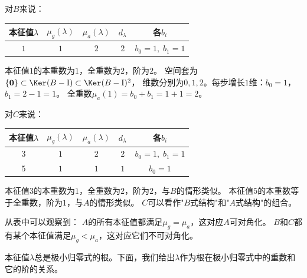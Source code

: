 \documentclass[12pt,UTF8,fontset=none]{ctexbook}
\begin{document}
对$B$来说：
\begin{center}
\begin{tabular}{c|c|c|c|c}
本征值$\lambda$ & $\mu_g(\lambda)$ & $\mu_a(\lambda)$ & $d_\lambda$ & 各$b_i$ \\
\hline
$1$ & $1$ & $2$ & $2$ & $b_0 = 1,\; b_1 = 1$ \\
\end{tabular}
\end{center}
本征值$1$的本重数为$1$，全重数为$2$，阶为$2$。
空间套为$\{\mathbf{0}\} \subset \Ker(B-\mathrm{I}) \subset \Ker(B-\mathrm{I})^2$，
维数分别为$0, 1, 2$。每步增长$1$维：$b_0 = 1$，$b_1 = 2 - 1 = 1$。
全重数$\mu_a(1) = b_0 + b_1 = 1 + 1 = 2$。

对$C$来说：
\begin{center}
\begin{tabular}{c|c|c|c|c}
本征值$\lambda$ & $\mu_g(\lambda)$ & $\mu_a(\lambda)$ & $d_\lambda$ & 各$b_i$ \\
\hline
$3$ & $1$ & $2$ & $2$ & $b_0 = 1,\; b_1 = 1$ \\
$5$ & $1$ & $1$ & $1$ & $b_0 = 1$ \\
\end{tabular}
\end{center}
本征值$3$的本重数为$1$，全重数为$2$，阶为$2$，与$B$的情形类似。
本征值$5$的本重数等于全重数，阶为$1$，与$A$的情形类似。
$C$可以看作"$B$式结构"和"$A$式结构"的组合。

从表中可以观察到：
$A$的所有本征值都满足$\mu_g = \mu_a$，这对应$A$可对角化。
$B$和$C$都有某个本征值满足$\mu_g < \mu_a$，这对应它们不可对角化。

本征值$\lambda$总是极小归零式的根。下面，我们给出$\lambda$作为根在极小归零式中的重数和它的阶的关系。
\end{document}
